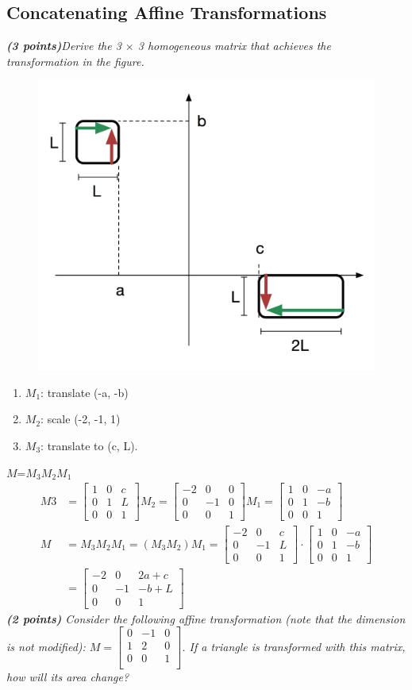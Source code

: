 \documentclass[a4paper,10pt]{article}
\begin{document}
\subsection{Concatenating Affine Transformations}
\textit{\textbf{(3 points)}Derive the 3 $\times$ 3 homogeneous matrix that achieves the transformation in the figure.}\\

\begin{figure}[H]
	\centering
	\includegraphics[width=.2\textwidth]{2-3-transformation}
\end{figure}
\begin{enumerate}
	\item $M_1$: translate (-a, -b)
	\item $M_2$: scale (-2, -1, 1)
	\item $M_3$: translate to (c, L).
\end{enumerate}
$M$=$M_3M_2M_1$
\[\begin{aligned}
M3&=\begin{bmatrix}
1 & 0 & c\\ 
0 & 1 & L\\ 
0 & 0 & 1
\end{bmatrix}
M_2=\begin{bmatrix}
-2 & 0 & 0\\ 
0 & -1 & 0\\ 
0 & 0 & 1
\end{bmatrix}
M_1	=\begin{bmatrix}
1 & 0 & -a\\ 
0 & 1 & -b\\ 
0 & 0 & 1
\end{bmatrix}\\
M&=M_3M_2M_1=(M_3M_2)M_1=\begin{bmatrix}
-2 & 0 & c\\ 
0 & -1 & L\\ 
0 & 0 & 1
\end{bmatrix}\cdot\begin{bmatrix}
1 & 0 & -a\\ 
0 & 1 & -b\\ 
0 & 0 & 1
\end{bmatrix}\\
&=\begin{bmatrix}
-2 & 0 & 2a +c\\ 
0 & -1 & -b+L\\ 
0 & 0 & 1
\end{bmatrix}
\end{aligned}\]
\textit{\textbf{(2 points)} Consider the following affine transformation (note that the  dimension is not modified): $M = \begin{bmatrix}
	0&-1&0\\
	1&2&0\\
	0&0&1\\
\end{bmatrix}$. If a triangle is transformed with this matrix, how will its area change?}\\
	
\end{document}
